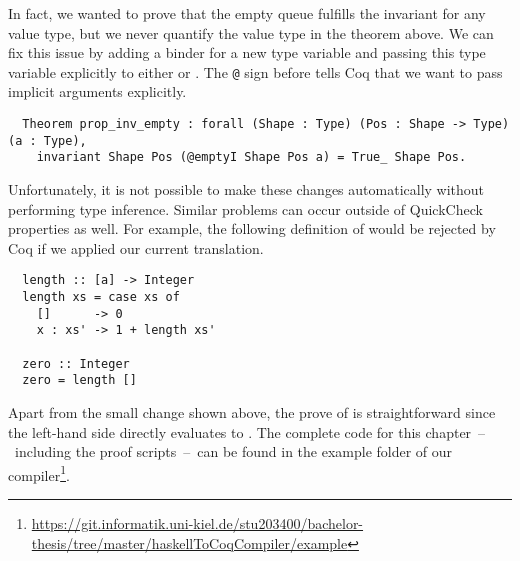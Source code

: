 In fact, we wanted to prove that the empty queue fulfills the invariant for any value type, but we never quantify the value type in the theorem above.
We can fix this issue by adding a binder for a new type variable and passing this type variable explicitly to either  or .
The \texttt{@} sign before  tells Coq that we want to pass implicit arguments explicitly.
\begin{verbatim}
  Theorem prop_inv_empty : forall (Shape : Type) (Pos : Shape -> Type) (a : Type),
    invariant Shape Pos (@emptyI Shape Pos a) = True_ Shape Pos.
\end{verbatim}
Unfortunately, it is not possible to make these changes automatically without performing type inference.
Similar problems can occur outside of QuickCheck properties as well.
For example, the following definition of  would be rejected by Coq if we applied our current translation.
\begin{verbatim}
  length :: [a] -> Integer
  length xs = case xs of
    []      -> 0
    x : xs' -> 1 + length xs'

  zero :: Integer
  zero = length []
\end{verbatim}
Apart from the small change shown above, the prove of  is straightforward since the left-hand side directly evaluates to .
The complete code for this chapter~--~including the proof scripts~--~can be found in the example folder of our compiler\footnote{\url{https://git.informatik.uni-kiel.de/stu203400/bachelor-thesis/tree/master/haskellToCoqCompiler/example}}.

